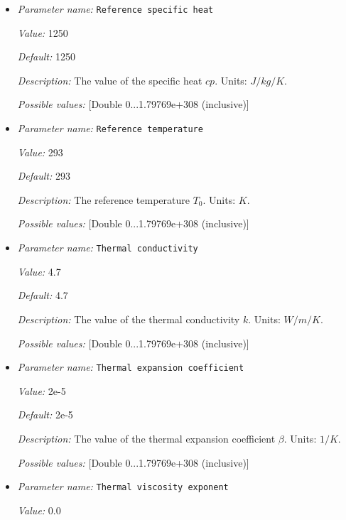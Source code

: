 \begin{itemize}
{\it Description:} Reference density $\rho_0$. Units: $kg/m^3$.


{\it Possible values:} [Double 0...1.79769e+308 (inclusive)]
\item {\it Parameter name:} {\tt Reference specific heat}


{\it Value:} 1250


{\it Default:} 1250


{\it Description:} The value of the specific heat $cp$. Units: $J/kg/K$.


{\it Possible values:} [Double 0...1.79769e+308 (inclusive)]
\item {\it Parameter name:} {\tt Reference temperature}


{\it Value:} 293


{\it Default:} 293


{\it Description:} The reference temperature $T_0$. Units: $K$.


{\it Possible values:} [Double 0...1.79769e+308 (inclusive)]
\item {\it Parameter name:} {\tt Thermal conductivity}


{\it Value:} 4.7


{\it Default:} 4.7


{\it Description:} The value of the thermal conductivity $k$. Units: $W/m/K$.


{\it Possible values:} [Double 0...1.79769e+308 (inclusive)]
\item {\it Parameter name:} {\tt Thermal expansion coefficient}


{\it Value:} 2e-5


{\it Default:} 2e-5


{\it Description:} The value of the thermal expansion coefficient $\beta$. Units: $1/K$.


{\it Possible values:} [Double 0...1.79769e+308 (inclusive)]
\item {\it Parameter name:} {\tt Thermal viscosity exponent}


{\it Value:} 0.0



\end{itemize}
